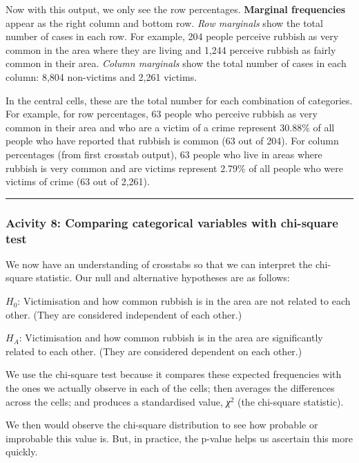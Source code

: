 \documentclass[
]{book}
\begin{document}
Now with this output, we only see the row percentages. \textbf{Marginal frequencies} appear as the right column and bottom row. \emph{Row marginals} show the total number of cases in each row. For example, 204 people perceive rubbish as very common in the area where they are living and 1,244 perceive rubbish as fairly common in their area. \emph{Column marginals} show the total number of cases in each column: 8,804 non-victims and 2,261 victims.

In the central cells, these are the total number for each combination of categories. For example, for row percentages, 63 people who perceive rubbish as very common in their area and who are a victim of a crime represent 30.88\% of all people who have reported that rubbish is common (63 out of 204). For column percentages (from first crosstab output), 63 people who live in areas where rubbish is very common and are victims represent 2.79\% of all people who were victims of crime (63 out of 2,261).

\begin{center}\rule{0.5\linewidth}{0.5pt}\end{center}

\hypertarget{acivity-8-comparing-categorical-variables-with-chi-square-test}{%
\subsubsection{Acivity 8: Comparing categorical variables with chi-square test}\label{acivity-8-comparing-categorical-variables-with-chi-square-test}}

We now have an understanding of crosstabs so that we can interpret the chi-square statistic. Our null and alternative hypotheses are as follows:

\(H_0\): Victimisation and how common rubbish is in the area are not related to each other. (They are considered independent of each other.)

\(H_A\): Victimisation and how common rubbish is in the area are significantly related to each other. (They are considered dependent on each other.)

We use the chi-square test because it compares these expected frequencies with the ones we actually observe in each of the cells; then averages the differences across the cells; and produces a standardised value, \emph{χ}\(^2\) (the chi-square statistic).

We then would observe the chi-square distribution to see how probable or improbable this value is. But, in practice, the p-value helps us ascertain this more quickly.
\end{document}
